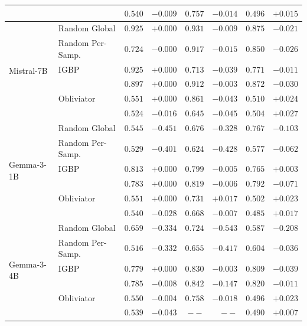 \begin{longtable}{ll|rr|rr|rr}
   & \TanGCE{} & $\boldsymbol{0.540}$ & $-0.009$ & $0.757$ & $-0.014$ & $\boldsymbol{0.496}$ & $+0.015$ \\
  \midrule
  \multirow{6}{*}{Mistral-7B} & Random Global & $0.925$ & $+0.000$ & $0.931$ & $-0.009$ & $0.875$ & $-0.021$ \\
   & Random Per-Samp. & $0.724$ & $-0.000$ & $0.917$ & $-0.015$ & $0.850$ & $-0.026$ \\
   & IGBP & $0.925$ & $\boldsymbol{+0.000}$ & $0.713$ & $-0.039$ & $0.771$ & $\boldsymbol{-0.011}$ \\
   & \AmbGCE{} & $0.897$ & $+0.000$ & $0.912$ & $\boldsymbol{-0.003}$ & $0.872$ & $-0.030$ \\
   & Obliviator & $0.551$ & $+0.000$ & $0.861$ & $-0.043$ & $0.510$ & $+0.024$ \\
   & \TanGCE{} & $\boldsymbol{0.524}$ & $-0.016$ & $\boldsymbol{0.645}$ & $-0.045$ & $\boldsymbol{0.504}$ & $+0.027$ \\
  \midrule
  \multirow{6}{*}{Gemma-3-1B} & Random Global & $0.545$ & $-0.451$ & $0.676$ & $-0.328$ & $0.767$ & $-0.103$ \\
   & Random Per-Samp. & $0.529$ & $-0.401$ & $0.624$ & $-0.428$ & $0.577$ & $-0.062$ \\
   & IGBP & $0.813$ & $\boldsymbol{+0.000}$ & $0.799$ & $\boldsymbol{-0.005}$ & $0.765$ & $\boldsymbol{+0.003}$ \\
   & \AmbGCE{} & $0.783$ & $+0.000$ & $0.819$ & $-0.006$ & $0.792$ & $-0.071$ \\
   & Obliviator & $0.551$ & $+0.000$ & $0.731$ & $+0.017$ & $0.502$ & $+0.023$ \\
   & \TanGCE{} & $\boldsymbol{0.540}$ & $-0.028$ & $\boldsymbol{0.668}$ & $-0.007$ & $\boldsymbol{0.485}$ & $+0.017$ \\
  \midrule
  \multirow{6}{*}{Gemma-3-4B} & Random Global & $0.659$ & $-0.334$ & $0.724$ & $-0.543$ & $0.587$ & $-0.208$ \\
   & Random Per-Samp. & $0.516$ & $-0.332$ & $0.655$ & $-0.417$ & $0.604$ & $-0.036$ \\
   & IGBP & $0.779$ & $\boldsymbol{+0.000}$ & $0.830$ & $\boldsymbol{-0.003}$ & $0.809$ & $-0.039$ \\
   & \AmbGCE{} & $0.785$ & $-0.008$ & $0.842$ & $-0.147$ & $0.820$ & $\boldsymbol{-0.011}$ \\
   & Obliviator & $0.550$ & $-0.004$ & $\boldsymbol{0.758}$ & $-0.018$ & $0.496$ & $+0.023$ \\
   & \TanGCE{} & $\boldsymbol{0.539}$ & $-0.043$ & $--$ & $--$ & $\boldsymbol{0.490}$ & $+0.007$ \\

\end{longtable}
